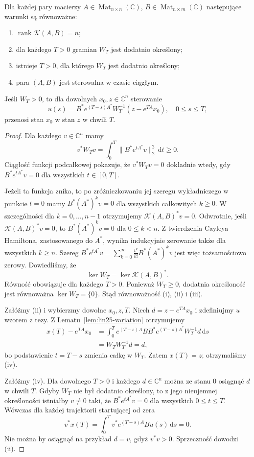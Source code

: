 \begin{twierdzenie}
\label{thm:lin25-gramian}
Dla każdej pary macierzy
\(A\in\operatorname{Mat}_{n\times n}(\mathbb C)\),
\(B\in\operatorname{Mat}_{n\times m}(\mathbb C)\)
następujące warunki
są równoważne:
\begin{enumerate}[label=\textup{(\roman*)}]
 \item \(\operatorname{rank}\mathcal K(A,B)=n\);
 \item dla każdego \(T>0\)
 gramian \(W_T\) jest dodatnio
 określony;
 \item istnieje \(T>0\),
 dla którego \(W_T\) jest
 dodatnio określony;
 \item para \((A,B)\)
 jest sterowalna w czasie ciągłym.
\end{enumerate}
Jeśli \(W_T>0\), to
dla dowolnych \(x_0,z\in\mathbb C^n\)
sterowanie
\[
 u(s)=B^*e^{(T-s)A^*}W_T^{-1}
             (z-e^{TA}x_0),\quad0\le s\le T,
\]
przenosi stan \(x_0\)
w stan \(z\) w chwili \(T\).
\end{twierdzenie}
\begin{proof}
Dla każdego \(v\in\mathbb C^n\)
mamy
\[
 v^*W_Tv
 =\int_0^T
      \bigl\|B^*e^{tA^*}v\bigr\|_2^2
      \,\mathrm dt\ge0.
\]
Ciągłość funkcji podcałkowej
pokazuje, że \(v^*W_Tv=0\)
dokładnie wtedy, gdy
\(B^*e^{tA^*}v=0\)
dla wszystkich \(t\in[0,T]\).

Jeżeli ta funkcja znika,
to po zróżniczkowaniu
jej szeregu wykładniczego
w punkcie \(t=0\) mamy
\(B^*(A^*)^kv=0\)
dla wszystkich całkowitych \(k\ge0\).
W szczególności dla
\(k=0,\ldots,n-1\)
otrzymujemy
\(\mathcal K(A,B)^*v=0\).
Odwrotnie, jeśli
\(\mathcal K(A,B)^*v=0\),
to \(B^*(A^*)^kv=0\)
dla \(0\le k<n\).
Z twierdzenia Cayleya--Hamiltona,
zastosowanego do \(A^*\),
wynika indukcyjnie
zerowanie także dla wszystkich
\(k\ge n\).
Szereg
\(B^*e^{tA^*}v
 =\sum_{k=0}^\infty
      \frac{t^k}{k!}B^*(A^*)^kv\)
jest więc tożsamościowo zerowy.
Dowiedliśmy, że
\[
 \ker W_T=\ker\mathcal K(A,B)^*.
\]
Równość obowiązuje dla
każdego \(T>0\).
Ponieważ \(W_T\ge0\),
dodatnia określoność
jest równoważna
\(\ker W_T=\{0\}\).
Stąd równoważność
(i), (ii) i (iii).

Załóżmy (ii) i wybierzmy
dowolne \(x_0,z,T\).
Niech \(d=z-e^{TA}x_0\)
i zdefiniujmy \(u\)
wzorem z tezy.
Z
Lematu~\ref{lem:lin25-variation}
otrzymujemy
\[
 \begin{aligned}
 x(T)-e^{TA}x_0
 &=\int_0^T e^{(T-s)A}BB^*
        e^{(T-s)A^*}W_T^{-1}d
       \,\mathrm ds\\
 &=W_TW_T^{-1}d=d,
 \end{aligned}
\]
bo podstawienie \(t=T-s\)
zmienia całkę w \(W_T\).
Zatem \(x(T)=z\);
otrzymaliśmy (iv).

Załóżmy (iv).
Dla dowolnego \(T>0\)
i każdego \(d\in\mathbb C^n\)
można ze stanu \(0\) osiągnąć
\(d\) w chwili \(T\).
Gdyby \(W_T\) nie był
dodatnio określony,
to z jego nieujemnej
określoności istniałby
\(v\ne0\) taki, że
\(B^*e^{tA^*}v=0\)
dla wszystkich \(0\le t\le T\).
Wówczas dla każdej trajektorii
startującej od zera
\[
 v^*x(T)=\int_0^T
          v^*e^{(T-s)A}Bu(s)
          \,\mathrm ds=0.
\]
Nie można by osiągnąć
na przykład \(d=v\),
gdyż \(v^*v>0\).
Sprzeczność dowodzi (ii).
\end{proof}

